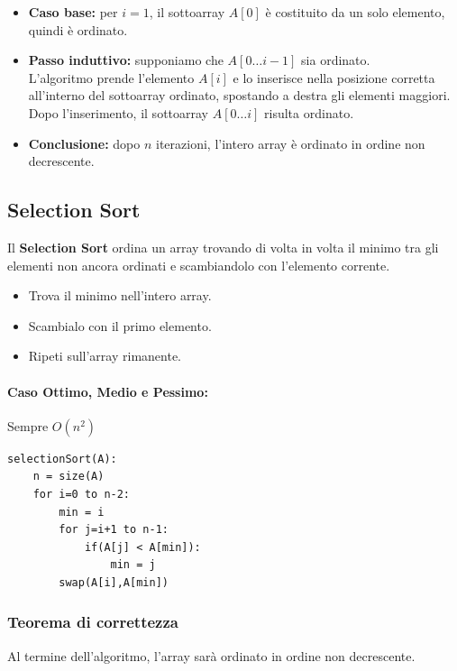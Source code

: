 \documentclass[a4paper,12pt]{article}
\begin{document}
\begin{itemize}
    \item \textbf{Caso base:} per $i = 1$, il sottoarray $A[0]$ è costituito da un solo elemento, quindi è ordinato.

    \item \textbf{Passo induttivo:} supponiamo che $A[0 \ldots i-1]$ sia ordinato.\\
    L'algoritmo prende l'elemento $A[i]$ e lo inserisce nella posizione corretta all'interno del sottoarray ordinato, spostando a destra gli elementi maggiori.\\
    Dopo l'inserimento, il sottoarray $A[0 \ldots i]$ risulta ordinato.

    \item \textbf{Conclusione:} dopo $n$ iterazioni, l'intero array è ordinato in ordine non decrescente.
\end{itemize}
\subsection{Selection Sort}
Il \textbf{Selection Sort} ordina un array trovando di volta in volta il minimo tra gli elementi non ancora ordinati e scambiandolo con l’elemento corrente.

\begin{itemize}
  \item Trova il minimo nell'intero array.
  \item Scambialo con il primo elemento.
  \item Ripeti sull’array rimanente.
\end{itemize}

\paragraph{Caso Ottimo, Medio e Pessimo:} Sempre $O(n^2)$

\begin{lstlisting}
selectionSort(A):
	n = size(A)
	for i=0 to n-2:
		min = i
		for j=i+1 to n-1:
			if(A[j] < A[min]):
				min = j
		swap(A[i],A[min])
\end{lstlisting}
\subsubsection{Teorema di correttezza}
Al termine dell'algoritmo, l'array sarà ordinato in ordine non decrescente.
\end{document}
